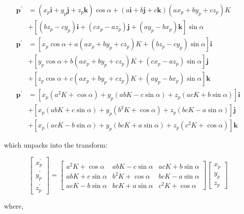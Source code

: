 \documentclass[10pt]{article}
\begin{document}
$$
\begin{aligned}
\mathbf{p}^{\prime} & =\left(x_{p} \mathbf{i}+y_{p} \mathbf{j}+z_{p} \mathbf{k}\right) \cos \alpha+(a \mathbf{i}+b \mathbf{j}+c \mathbf{k})\left(a x_{p}+b y_{p}+c z_{p}\right) K \\
& +\left[\left(b z_{p}-c y_{p}\right) \mathbf{i}+\left(c x_{p}-a z_{p}\right) \mathbf{j}+\left(a y_{p}-b x_{p}\right) \mathbf{k}\right] \sin \alpha \\
\mathbf{p}^{\prime} & =\left[x_{p} \cos \alpha+a\left(a x_{p}+b y_{p}+c z_{p}\right) K+\left(b z_{p}-c y_{p}\right) \sin \alpha\right] \mathbf{i} \\
& +\left[y_{p} \cos \alpha+b\left(a x_{p}+b y_{p}+c z_{p}\right) K+\left(c x_{p}-a z_{p}\right) \sin \alpha\right] \mathbf{j} \\
& +\left[z_{p} \cos \alpha+c\left(a x_{p}+b y_{p}+c z_{p}\right) K+\left(a y_{p}-b x_{p}\right) \sin \alpha\right] \mathbf{k} \\
\mathbf{p}^{\prime} & =\left[x_{p}\left(a^{2} K+\cos \alpha\right)+y_{p}(a b K-c \sin \alpha)+z_{p}(a c K+b \sin \alpha)\right] \mathbf{i} \\
& +\left[x_{p}(a b K+c \sin \alpha)+y_{p}\left(b^{2} K+\cos \alpha\right)+z_{p}(b c K-a \sin \alpha)\right] \mathbf{j} \\
& +\left[x_{p}(a c K-b \sin \alpha)+y_{p}(b c K+a \sin \alpha)+z_{p}\left(c^{2} K+\cos \alpha\right)\right] \mathbf{k}
\end{aligned}
$$

which unpacks into the transform:

$$
\left[\begin{array}{c}
x_{p}^{\prime} \\
y_{p}^{\prime} \\
z_{p}^{\prime}
\end{array}\right]=\left[\begin{array}{ccc}
a^{2} K+\cos \alpha & a b K-c \sin \alpha & a c K+b \sin \alpha \\
a b K+c \sin \alpha & b^{2} K+\cos \alpha & b c K-a \sin \alpha \\
a c K-b \sin \alpha & b c K+a \sin \alpha & c^{2} K+\cos \alpha
\end{array}\right]\left[\begin{array}{l}
x_{p} \\
y_{p} \\
z_{p}
\end{array}\right]
$$

where,
\end{document}
